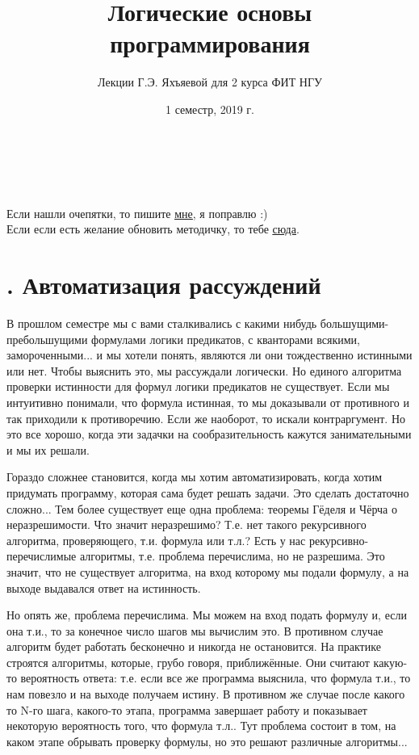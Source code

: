 \documentclass[18pt, a4paper]{extarticle}
\title{Логические основы программирования}
\author{Лекции Г.Э. Яхъяевой для 2 курса ФИТ НГУ}
\date{1 семестр, 2019 г.}
\newcounter{thm}
\newcounter{par}
\newcounter{zap}
\newcommand{\msection}[1]{\stepcounter{thm}\section*{\thethm. #1}\addcontentsline{toc}{section}{\thethm. #1}}
\begin{document}
\linespread{1.3}
 \fontsize{19pt}{22pt}\selectfont
\maketitle

\tableofcontents

\leavevmode\\\\\leavevmode\begin{center}
    Если нашли очепятки, то пишите \href{https://vk.com/id177003653}{\underline{мне}}, я поправлю :)\\
	Если если есть желание обновить методичку, то тебе \href{https://github.com/comiam/LOP-book}{\underline{сюда}}.
\end{center}

\newpage

\setcounter{par}{22}
\setcounter{zap}{1}
\setcounter{thm}{0}

\msection{Автоматизация рассуждений}

В прошлом семестре мы с вами сталкивались с какими нибудь большущими-пребольшущими формулами логики предикатов, с кванторами всякими, замороченными... и мы хотели понять, являются ли они тождественно истинными или нет. Чтобы выяснить это, мы рассуждали логически. Но единого алгоритма проверки истинности для формул логики предикатов не существует. Если мы интуитивно понимали, что формула истинная, то мы доказывали от противного и так приходили к противоречию. Если же наоборот, то искали контраргумент. Но это все хорошо, когда эти задачки на сообразительность кажутся занимательными и мы их решали. 

Гораздо сложнее становится, когда мы хотим автоматизировать, когда хотим придумать программу, которая сама будет решать задачи. Это сделать достаточно сложно... Тем более существует еще одна проблема: теоремы Гёделя и Чёрча о неразрешимости. Что значит неразрешимо? Т.е. нет такого рекурсивного алгоритма, проверяющего, т.и. формула или т.л.? Есть у нас рекурсивно-перечислимые алгоритмы, т.е. проблема перечислима, но не разрешима. Это значит, что не существует алгоритма, на вход которому мы подали формулу, а на выходе выдавался ответ на истинность.

Но опять же, проблема перечислима. Мы можем на вход подать формулу и, если она т.и., то за конечное число шагов мы вычислим это. В противном случае алгоритм будет работать бесконечно и никогда не остановится. На практике строятся алгоритмы, которые, грубо говоря, приближённые. Они считают какую-то вероятность ответа: т.е. если все же программа выяснила, что формула т.и., то нам повезло и на выходе получаем истину. В противном же случае после какого то N-го шага, какого-то этапа, программа завершает работу и показывает некоторую вероятность того, что формула т.л.. Тут проблема состоит в том, на каком этапе обрывать проверку формулы, но это решают различные алгоритмы...
\end{document}
